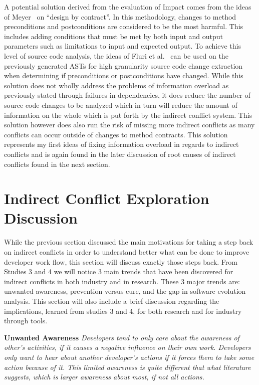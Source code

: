 A potential solution derived from the evaluation of Impact comes from the ideas of Meyer~\cite{Meyer:1988} on 
``design by contract''. In this methodology, changes to method preconditions and postconditions are considered 
to be the most harmful. This includes adding conditions that must be met by both input and output parameters 
such as limitations to input and expected output. To achieve this level of source code analysis, the ideas of 
Fluri et al.~\cite{Fluri:2007:CDT} can be used on the previously generated ASTs for high granularity source code 
change extraction when determining if preconditions or postconditions have changed. While this solution does not 
wholly address the problems of information overload as previously stated through failures in dependencies, it does 
reduce the number of source code changes to  be analyzed which in turn will reduce the amount of information on 
the whole which is put forth by the indirect
conflict system. This solution however does also run the risk of missing more indirect conflicts as many conflicts
can occur outside of changes to method contracts. This solution represents my first ideas of fixing information overload in regards to
indirect conflicts and is again found in the later discussion of root causes of indirect conflicts found in
the next section.

\section{Indirect Conflict Exploration Discussion}

While the previous section discussed the main motivations for taking a step back on indirect conflicts in order to understand
better what can be done to improve developer work flow, this section will discuss exactly those steps back. From Studies 3 and
4 we will notice 3 main trends that have been discovered for indirect conflicts in both industry and in research. These 3 major
trends are: unwanted awareness, prevention versus cure, and the gap in software evolution analysis. This
section will also include a brief discussion regarding the implications, learned from studies 3 and 4, for both research and
for industry through tools.

\textbf{Unwanted Awareness} \textit{Developers tend to only care about the awareness of other's activities, if it causes
a negative influence on their own work. Developers only want to hear about another developer's actions if it forces them
to take some action because of it. This limited awareness is quite different that what literature suggests, which is larger
awareness about most, if not all actions.}

